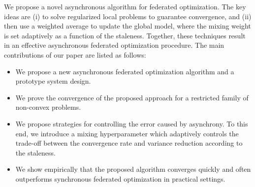 \documentclass{opt2020} %
\begin{document}
We propose a novel asynchronous algorithm for federated optimization. The key ideas are (i) to solve regularized local problems to guarantee convergence, and (ii) then use a weighted average to update the global model, where the mixing weight is set adaptively as a function of the staleness. Together, these techniques result in an effective asynchronous federated optimization procedure.
The main contributions of our paper are listed as follows:
\begin{itemize}[topsep=2pt,itemsep=0pt,partopsep=0pt,parsep=0pt]
\item We propose a new asynchronous federated optimization algorithm and a prototype system design.
\item We prove the convergence of the proposed approach for a restricted family of non-convex problems.
\item We propose strategies for controlling the error caused by asynchrony. To this end, we introduce a mixing hyperparameter which adaptively controls the trade-off between the convergence rate and variance reduction according to the staleness.
\item We show empirically that the proposed algorithm converges quickly and often outperforms synchronous federated optimization in practical settings.
\end{itemize}

%
\end{document}
